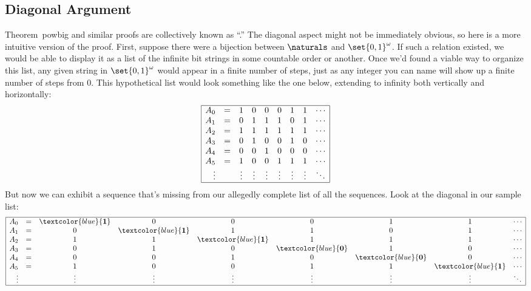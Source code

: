 \subsection{Diagonal Argument}
Theorem~{powbig} and similar proofs are collectively known as
``.''  The diagonal
aspect might not be immediately obvious, so here is a more intuitive
version of the proof.  First, suppose there were a bijection between
$\naturals$ and $\set{0,1}^{\omega}$.  If such a relation existed, we
would be able to display it as a list of the infinite bit strings in
some countable order or another.  Once we'd found a viable way
to organize this list, any given string in $\set{0,1}^{\omega}$ would
appear in a finite number of steps, just as any integer you can name
will show up a finite number of steps from 0.  This hypothetical list
would look something like the one below, extending to infinity both
vertically and horizontally:
\[\begin{array}{|rc c c c c c c l|}
\hline
A_0 &=  & 1 & 0 & 0 & 0 & 1 & 1 & \cdots\\
A_1 &=  & 0 & 1 & 1 & 1 & 0 & 1 & \cdots\\
A_2 &=  & 1 & 1 & 1 & 1 & 1 & 1 & \cdots\\
A_3 &=  & 0 & 1 & 0 & 0 & 1 & 0 & \cdots\\
A_4 &=  & 0 & 0 & 1 & 0 & 0 & 0 & \cdots\\
A_5 &=  & 1 & 0 & 0 & 1 & 1 & 1 & \cdots\\
\vdots & & \vdots & \vdots & \vdots & \vdots & \vdots &
         \vdots & \ddots\\
\hline
\end{array}\]
But now we can exhibit a sequence that's missing from our allegedly
complete list of all the sequences.  Look at the diagonal in our
sample list:
\[\begin{array}{|rc c c c c c c l|}
\hline
A_0 &=  & \textcolor{blue}{\mathbf{1}} & 0 & 0 & 0 & 1 & 1 & \cdots \\
A_1 &=  & 0 & \textcolor{blue}{\mathbf{1}} & 1 & 1 & 0 & 1 & \cdots \\
A_2 &=  & 1 & 1 & \textcolor{blue}{\mathbf{1}} & 1 & 1 & 1 & \cdots \\
A_3 &=  & 0 & 1 & 0 & \textcolor{blue}{\mathbf{0}} & 1 & 0 & \cdots \\
A_4 &=  & 0 & 0 & 1 & 0 & \textcolor{blue}{\mathbf{0}} & 0 & \cdots \\
A_5 &=  & 1 & 0 & 0 & 1 & 1 & \textcolor{blue}{\mathbf{1}} & \cdots \\
\vdots & & \vdots & \vdots & \vdots & \vdots & \vdots & \vdots & \ddots\\
\hline
\end{array}\]
